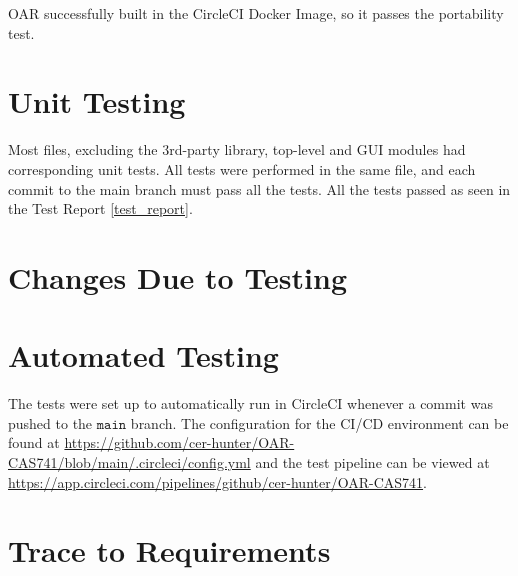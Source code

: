 \documentclass[12pt, titlepage]{article}
\begin{document}
\begin{emumerate}
OAR successfully built in the CircleCI Docker Image, so it passes the portability test.

\section{Unit Testing}

Most files, excluding the 3rd-party library, top-level and GUI modules had corresponding unit tests.
All tests were performed in the same file, and each commit to the main branch must pass all the tests.
All the tests passed as seen in the Test Report \ref{test_report}.

\section{Changes Due to Testing}


\section{Automated Testing}

The tests were set up to automatically run in CircleCI whenever a commit was pushed to the $\mathtt{main}$ branch.
The configuration for the CI/CD environment can be found at \url{https://github.com/cer-hunter/OAR-CAS741/blob/main/.circleci/config.yml}
and the test pipeline can be viewed at \url{https://app.circleci.com/pipelines/github/cer-hunter/OAR-CAS741}.
		
\section{Trace to Requirements}


\end{emumerate}
\end{document}
